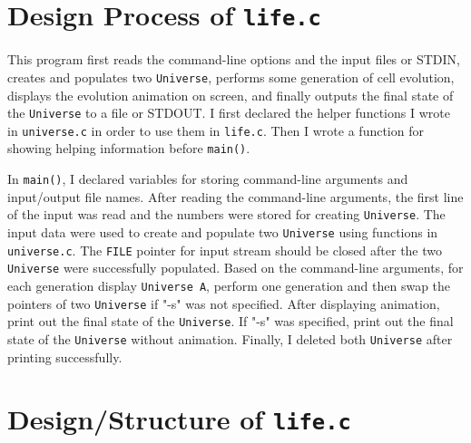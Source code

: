\documentclass[12pt]{article}
\begin{document}
\section{Design Process of \texttt{life.c}}

This program first reads the command-line options and the input files or STDIN, creates and populates two \texttt{Universe}, performs some generation of cell evolution, displays the evolution animation on screen, and finally outputs the final state of the \texttt{Universe} to a file or STDOUT. I first declared the helper functions I wrote in \texttt{universe.c} in order to use them in \texttt{life.c}. Then I wrote a function for showing helping information before \texttt{main()}.

In \texttt{main()}, I declared variables for storing command-line arguments and input/output file names. After reading the command-line arguments, the first line of the input was read and the numbers were stored for creating \texttt{Universe}. The input data were used to create and populate two \texttt{Universe} using functions in \texttt{universe.c}. The \texttt{FILE} pointer for input stream should be closed after the two \texttt{Universe} were successfully populated. Based on the command-line arguments, for each generation display \texttt{Universe A}, perform one generation and then swap the pointers of two \texttt{Universe} if "-s" was not specified. After displaying animation, print out the final state of the \texttt{Universe}. If "-s" was specified, print out the final state of the \texttt{Universe} without animation. Finally, I deleted both \texttt{Universe} after printing successfully.

\section{Design/Structure of \texttt{life.c}}
\end{document}

